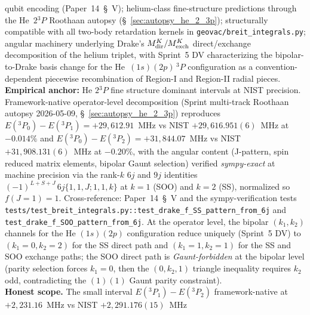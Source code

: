 \documentclass[11pt]{article}
\begin{document}
qubit encoding (Paper~14~\S~V); helium-class fine-structure
predictions through the He~$2{}^3\!P$ Roothaan autopsy
(\S~\ref{sec:autopsy_he_2_3p}); structurally compatible with all
two-body retardation kernels in
\texttt{geovac/breit\_integrals.py}; angular machinery underlying
Drake's $M^K_{\rm dir} / M^K_{\rm exch}$ direct/exchange
decomposition of the helium triplet, with Sprint~5 DV
characterizing the bipolar-to-Drake basis change for the
He~$(1s)(2p)\,{}^3\!P$ configuration as a
convention-dependent piecewise recombination of Region-I and
Region-II radial pieces.\\
\textbf{Empirical anchor:} He $2{}^3\!P$ fine structure dominant
intervals at NIST precision.  Framework-native operator-level
decomposition (Sprint multi-track Roothaan autopsy 2026-05-09,
\S~\ref{sec:autopsy_he_2_3p}) reproduces
$E({}^3\!P_0) - E({}^3\!P_1) = +29{,}612.91$~MHz vs NIST
$+29{,}616.951(6)$~MHz at $-0.014\%$ and
$E({}^3\!P_0) - E({}^3\!P_2) = +31{,}844.07$~MHz vs NIST
$+31{,}908.131(6)$~MHz at $-0.20\%$, with the angular content (J-pattern,
spin reduced matrix elements, bipolar Gaunt selection) verified
\emph{sympy-exact} at machine precision via the rank-$k$ $6j$ and
$9j$ identities $(-1)^{L+S+J}\,6j\{1,1,J;1,1,k\}$ at $k = 1$ (SOO)
and $k = 2$ (SS), normalized so $f(J{=}1) = 1$.  Cross-reference:
Paper~14~\S~V and the sympy-verification tests
\texttt{tests/test\_breit\_integrals.py::test\_drake\_f\_SS\_pattern\_from\_6j}
and \texttt{test\_drake\_f\_SOO\_pattern\_from\_6j}.  At the
operator level, the bipolar $(k_1, k_2)$ channels for the He
$(1s)(2p)$ configuration reduce uniquely (Sprint~5 DV) to
$(k_1{=}0, k_2{=}2)$ for the SS direct path and $(k_1{=}1, k_2{=}1)$
for the SS and SOO exchange paths; the SOO direct path is
\emph{Gaunt-forbidden} at the bipolar level (parity selection forces
$k_1 = 0$, then the $(0, k_2, 1)$ triangle inequality requires
$k_2$ odd, contradicting the $(1)(1)$ Gaunt parity constraint).\\
\textbf{Honest scope.}  The small interval $E({}^3\!P_1) - E({}^3\!P_2)$
framework-native at $+2{,}231.16$~MHz vs NIST $+2{,}291.176(15)$~MHz
\end{document}
